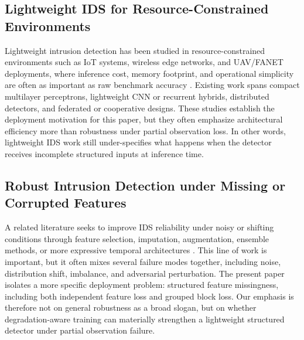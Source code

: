 \subsection{Lightweight IDS for Resource-Constrained Environments}
Lightweight intrusion detection has been studied in resource-constrained environments such as IoT systems, wireless edge networks, and UAV/FANET deployments, where inference cost, memory footprint, and operational simplicity are often as important as raw benchmark accuracy \cite{lightweight_ids_survey,edge_ids_survey,uav_fanet_ids_survey}. Existing work spans compact multilayer perceptrons, lightweight CNN or recurrent hybrids, distributed detectors, and federated or cooperative designs. These studies establish the deployment motivation for this paper, but they often emphasize architectural efficiency more than robustness under partial observation loss. In other words, lightweight IDS work still under-specifies what happens when the detector receives incomplete structured inputs at inference time.

\subsection{Robust Intrusion Detection under Missing or Corrupted Features}
A related literature seeks to improve IDS reliability under noisy or shifting conditions through feature selection, imputation, augmentation, ensemble methods, or more expressive temporal architectures \cite{robust_ids_missing_data,missing_data_ids_survey,distribution_shift_ml}. This line of work is important, but it often mixes several failure modes together, including noise, distribution shift, imbalance, and adversarial perturbation. The present paper isolates a more specific deployment problem: structured feature missingness, including both independent feature loss and grouped block loss. Our emphasis is therefore not on general robustness as a broad slogan, but on whether degradation-aware training can materially strengthen a lightweight structured detector under partial observation failure.


